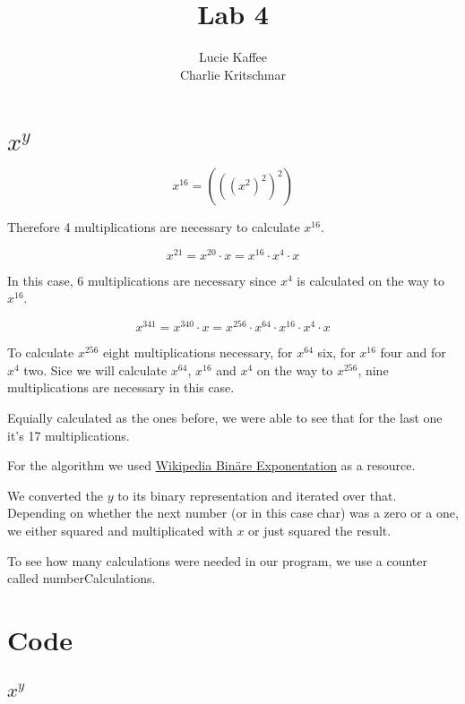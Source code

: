 \documentclass[11pt]{article}
\title{\textbf{Lab 4}}
\author{Lucie Kaffee\\
		Charlie Kritschmar
		}
\date{}
\begin{document}
\maketitle

\section{$x^{y}$}
\begin{equation}
x^{16} = (((x^ {2})^{2})^{2})
\end{equation}

Therefore 4 multiplications are necessary to calculate $x^{16}$.

\begin{equation}
x^{21} = x^ {20} \cdot x = x^{16} \cdot x^{4} \cdot x
\end{equation}

In this case, 6 multiplications are necessary since $x^{4}$ is calculated on the way to $x^{16}$. 

\begin{equation}
x^{341} = x^ {340} \cdot x = x^{256} \cdot x^{64} \cdot x^{16} \cdot x^{4} \cdot x
\end{equation}

To calculate $x^{256}$ eight multiplications necessary, for $x^{64}$ six, for $x^{16}$ four and for $x^{4}$ two. Sice we will calculate $x^{64}$, $x^{16}$ and $x^{4}$ on the way to $x^{256}$, nine multiplications are necessary in this case.

Equially calculated as the ones before, we were able to see that for the last one it's 17 multiplications.

For the algorithm we used \href{https://de.wikipedia.org/wiki/Bin%C3%A4re_Exponentiation#Pseudocode_.28Algorithmus.29}{Wikipedia Bin\"are Exponentation} as a resource.

We converted the $y$ to its binary representation and iterated over that. Depending on whether the next number (or in this case char) was a zero or a one, we either squared and multiplicated with $x$ or just squared the result.  

To see how many calculations were needed in our program, we use a counter called numberCalculations.

\section{Code}
\subsection{$x^{y}$}


\subsection{}
\end{document}
